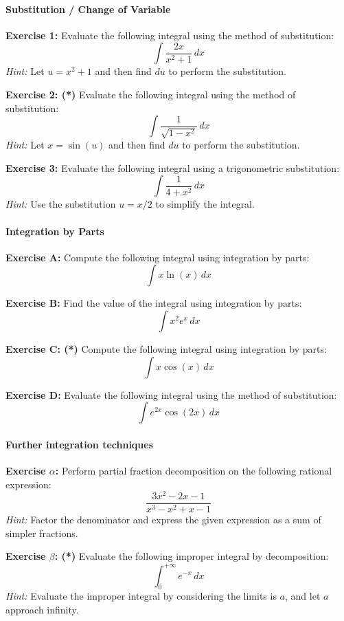 \documentclass[]{article}
\begin{document}
	\paragraph{Substitution / Change of Variable}\mbox{}
	
	
	\textbf{Exercise 1:}
	Evaluate the following integral using the method of substitution:
	\[
	\int \frac{2x}{x^2 + 1} \, dx
	\]
	\textit{Hint:} Let \( u = x^2 + 1 \) and then find \( du \) to perform the substitution.
	
	\textbf{Exercise 2: (*)}
	Evaluate the following integral using the method of substitution:
	\[
	\int \frac{1}{\sqrt{1 - x^2}} \, dx
	\]
	\textit{Hint:} Let \( x = \sin(u) \) and then find \( du \) to perform the substitution.
	
	\textbf{Exercise 3:}
	Evaluate the following integral using a trigonometric substitution:
	\[
	\int \frac{1}{4 + x^2} \, dx
	\]
	\textit{Hint:} Use the substitution \(u = x/2\) to simplify the integral.
	
	
	\paragraph{Integration by Parts}\mbox{}
	
	\textbf{Exercise A:}
	Compute the following integral using integration by parts:
	\[
	\int x \ln(x) \, dx
	\]
	
	\textbf{Exercise B:}
	Find the value of the integral using integration by parts:
	\[
	\int x^2 e^x \, dx
	\]
	
	\textbf{Exercise C: (*)}
	Compute the following integral using integration by parts:
	\[
	\int x \cos(x) \, dx
	\]
	
	\textbf{Exercise D:}
	Evaluate the following integral using the method of substitution:
	\[
	\int e^{2x} \cos(2x) \, dx
	\]
	
	
	\paragraph{Further integration techniques}\mbox{}
	
	\textbf{Exercise $\alpha$:}
	Perform partial fraction decomposition on the following rational expression:
	\[
	\frac{3x^2 - 2x - 1}{x^3 - x^2 + x - 1}
	\]
	\textit{Hint:} Factor the denominator and express the given expression as a sum of simpler fractions.
	
	\textbf{Exercise $\beta$: (*)}
	Evaluate the following improper integral by decomposition:
	\[
	\int_0^{+\infty} e^{-x}\, dx
	\]
	\textit{Hint:} Evaluate the improper integral by considering the limits is $a$, and let $a$ approach infinity.
	
\end{document}
